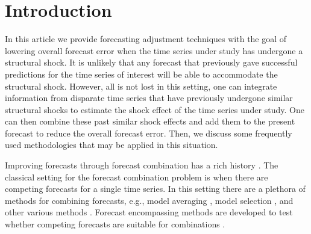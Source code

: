 \documentclass[11pt]{article}
\theoremstyle{definition}
\begin{document}
\section{Introduction}

In this article we provide forecasting adjustment techniques with the goal of lowering overall forecast error when the time series under study has undergone a structural shock. It is unlikely that any forecast that previously gave successful predictions for the time series of interest will be able to accommodate the structural shock.  However, all is not lost in this setting, one can integrate information from disparate time series that have previously undergone similar structural shocks to estimate the shock effect of the time series under study. One can then combine these past similar shock effects and add them to the present forecast to reduce the overall forecast error. Then, we discuss some frequently used methodologies that may be applied in this situation.


Improving forecasts through forecast combination has a rich history \citep{bates1969combination, mundlak1978pooling, timmermann2006forecast, granger2014forecasting}.  
The classical setting for the forecast combination problem is when there are competing forecasts for a single time series.  %
In this setting there are a plethora of methods for combining forecasts, e.g., model averaging \citep{newbold2002forecast, hendry2004pooling, koop2004forecasting, timmermann2006forecast, eklund2007forecast, hansen2008least}, model selection \citep{swanson1997model, swanson2001choosing, lee2015model}, and other various methods \citep{pesaran2011forecast,li2014forecasting}. Forecast encompassing methods are developed to test whether competing forecasts are suitable for combinations \citep{newbold2002forecast, fang2003forecasting}.
\end{document}
